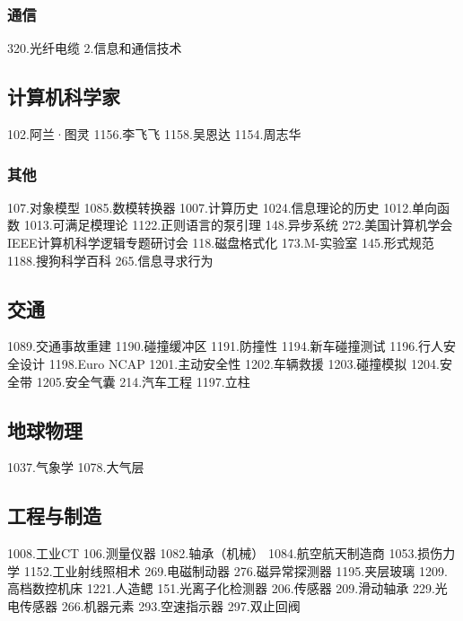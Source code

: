 \subsubsection{通信}
320.光纤电缆
2.信息和通信技术
\subsection{计算机科学家}
102.阿兰·图灵
1156.李飞飞
1158.吴恩达
1154.周志华
\subsubsection{其他}
107.对象模型
1085.数模转换器
1007.计算历史
1024.信息理论的历史
1012.单向函数
1013.可满足模理论
1122.正则语言的泵引理
148.异步系统
272.美国计算机学会IEEE计算机科学逻辑专题研讨会
118.磁盘格式化
173.M-实验室
145.形式规范
1188.搜狗科学百科
265.信息寻求行为

\subsection{交通}
1089.交通事故重建
1190.碰撞缓冲区
1191.防撞性
1194.新车碰撞测试
1196.行人安全设计
1198.Euro NCAP
1201.主动安全性
1202.车辆救援
1203.碰撞模拟
1204.安全带
1205.安全气囊
214.汽车工程
1197.立柱

\subsection{地球物理}
1037.气象学
1078.大气层

\subsection{工程与制造}
1008.工业CT
106.测量仪器
1082.轴承（机械）
1084.航空航天制造商
1053.损伤力学
1152.工业射线照相术
269.电磁制动器
276.磁异常探测器
1195.夹层玻璃
1209.高档数控机床
1221.人造鳃
151.光离子化检测器
206.传感器
209.滑动轴承
229.光电传感器
266.机器元素
293.空速指示器
297.双止回阀
